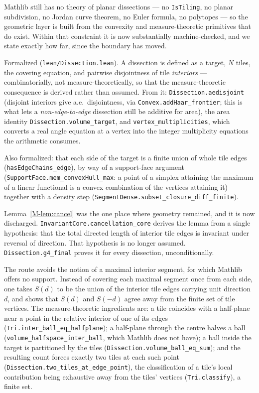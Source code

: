 \documentclass[11pt,reqno]{amsart}
\theoremstyle{plain}
\theoremstyle{definition}
\begin{document}
Mathlib still has no theory of planar dissections --- no \texttt{IsTiling}, no planar subdivision,
no Jordan curve theorem, no Euler formula, no polytopes --- so the geometric layer is built from the
convexity and measure-theoretic primitives that do exist. Within that constraint it is now
substantially machine-checked, and we state exactly how far, since the boundary has moved.

Formalized (\texttt{lean/Dissection.lean}). A dissection is defined as a target, $N$ tiles, the
covering equation, and pairwise disjointness of tile \emph{interiors} --- combinatorially, not
measure-theoretically, so that the measure-theoretic consequence is derived rather than assumed.
From it: \texttt{Dissection.aedisjoint} (disjoint interiors give a.e.\ disjointness, via
\texttt{Convex.addHaar\_frontier}; this is what lets a \emph{non-edge-to-edge} dissection still be
additive for area), the area identity \texttt{Dissection.volume\_target}, and
\texttt{vertex\_multiplicities}, which converts a real angle equation at a vertex into the integer
multiplicity equations the arithmetic consumes.

Also formalized: that each side of the target is a finite union of whole tile edges
(\texttt{hasEdgeChains\_edge}), by way of a support-face argument
(\texttt{SupportFace.mem\_convexHull\_max}: a point of a simplex attaining the maximum of a linear
functional is a convex combination of the vertices attaining it) together with a density step
(\texttt{SegmentDense.subset\_closure\_diff\_finite}).

Lemma~\ref{M-lem:cancel} was the one place where geometry remained, and it is now discharged.
\texttt{InvariantCore.cancellation\_core} derives the lemma from a single hypothesis: that the total
directed length of interior tile edges is invariant under reversal of direction. That hypothesis is
no longer assumed. \texttt{Dissection.g4\_final} proves it for every dissection, unconditionally.

The route avoids the notion of a maximal interior segment, for which Mathlib offers no support.
Instead of covering each maximal segment once from each side, one takes $S(d)$ to be the union of the
interior tile edges carrying unit direction $d$, and shows that $S(d)$ and $S(-d)$ agree away from the
finite set of tile vertices. The measure-theoretic ingredients are: a tile coincides with a half-plane
near a point in the relative interior of one of its edges (\texttt{Tri.inter\_ball\_eq\_halfplane}); a
half-plane through the centre halves a ball (\texttt{volume\_halfspace\_inter\_ball}, which Mathlib
does not have); a ball inside the target is partitioned by the tiles
(\texttt{Dissection.volume\_ball\_eq\_sum}); and the resulting count forces exactly two tiles at each
such point (\texttt{Dissection.two\_tiles\_at\_edge\_point}), the classification of a tile's local
contribution being exhaustive away from the tiles' vertices (\texttt{Tri.classify}), a finite set.
\end{document}
